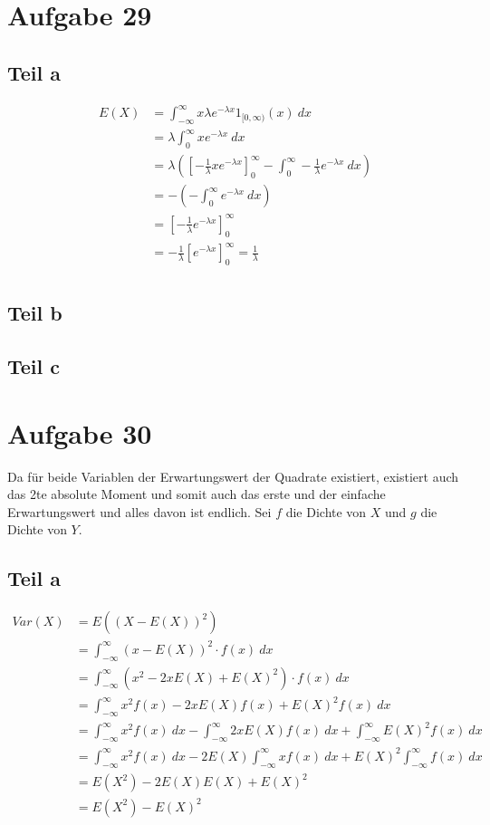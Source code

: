 \documentclass[10pt,a4paper]{article}
\begin{document}
\section{Aufgabe 29}

\subsection{Teil a}
\begin{align*}
  E(X) & = \int_{-\infty}^{\infty} x \lambda e^{-\lambda x} 1_{[0, \infty)}(x)\ dx\\
  & = \lambda \int_{0}^{\infty} x e^{-\lambda x}\ dx\\
  & = \lambda \left( \left[ -\frac{1}{\lambda} x e^{-\lambda x} \right]_{0}^{\infty} - \int_{0}^{\infty} -\frac{1}{\lambda} e^{-\lambda x}\ dx \right)\\
  & = -\left( -\int_{0}^{\infty} e^{-\lambda x}\ dx \right)\\
  & = \left[ -\frac{1}{\lambda} e^{-\lambda x} \right]_{0}^{\infty}\\
  & = -\frac{1}{\lambda} \left[ e^{-\lambda x} \right]_{0}^{\infty} = \frac{1}{\lambda}\\
\end{align*}

\subsection{Teil b}

\subsection{Teil c}

\section{Aufgabe 30}
Da für beide Variablen der Erwartungswert der Quadrate existiert, existiert auch das 2te absolute Moment und somit auch das erste und der einfache Erwartungswert und alles davon ist endlich.
Sei $f$ die Dichte von $X$ und $g$ die Dichte von $Y$.

\subsection{Teil a}
\begin{align*}
  Var(X) & = E((X - E(X))^{2})\\
  & = \int_{-\infty}^{\infty} (x - E(X))^{2} \cdot f(x)\ dx\\
  & = \int_{-\infty}^{\infty} (x^{2} - 2xE(X) + E(X)^{2}) \cdot f(x)\ dx\\
  & = \int_{-\infty}^{\infty} x^{2}f(x) - 2xE(X)f(x) + E(X)^{2}f(x)\ dx\\
  & = \int_{-\infty}^{\infty} x^{2}f(x)\ dx - \int_{-\infty}^{\infty} 2xE(X)f(x)\ dx + \int_{-\infty}^{\infty} E(X)^{2}f(x)\ dx\\
  & = \int_{-\infty}^{\infty} x^{2}f(x)\ dx - 2E(X) \int_{-\infty}^{\infty} xf(x)\ dx + E(X)^{2} \int_{-\infty}^{\infty} f(x)\ dx\\
  & = E(X^{2}) - 2E(X) E(X) + E(X)^{2}\\
  & = E(X^{2}) - E(X)^{2}
\end{align*}
\end{document}
